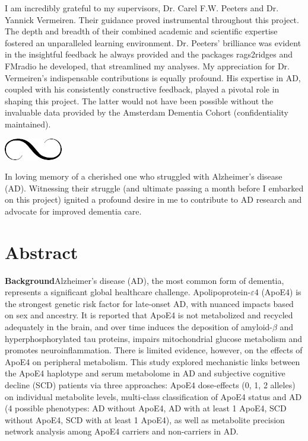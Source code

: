 \documentclass{amsart}
\newcommand{\parasep}{
\begin{center} 
   \includegraphics[scale=.3]{figures/eYzOK.png} 
\end{center}}
\begin{document}
I am incredibly grateful to my supervisors, Dr. Carel F.W. Peeters and Dr. Yannick Vermeiren. Their guidance proved instrumental throughout this project. The depth and breadth of their combined academic and scientific expertise fostered an unparalleled learning environment. Dr. Peeters' brilliance was evident in the insightful feedback he always provided and the packages \textsf{rags2ridges} and \textsf{FMradio} he developed, that streamlined my analyses. My appreciation for Dr. Vermeiren's indispensable contributions is equally profound. His expertise in AD, coupled with his consistently constructive feedback, played a pivotal role in shaping this project. The latter would not have been possible without the invaluable data provided by the Amsterdam Dementia Cohort (confidentiality maintained).\\
\parasep
In loving memory of a cherished one who struggled with Alzheimer's disease (AD). Witnessing their struggle (and ultimate passing a month before I embarked on this project) ignited a profound desire in me to contribute to AD research and advocate for improved dementia care.
\begin{figure}[!b]

\end{figure}
\newpage
{}
\section*{Abstract}
\textbf{Background}\hspace{.1cm}Alzheimer's disease (AD), the most common form of dementia, represents a significant global healthcare challenge. Apolipoprotein-$\varepsilon$4 (ApoE4) is the strongest genetic risk factor for late-onset AD, with nuanced impacts based on sex and ancestry. It is reported that ApoE4 is not metabolized and recycled adequately in the brain, and over time induces the deposition of amyloid-$\beta$ and hyperphosphorylated tau proteins, impairs mitochondrial glucose metabolism and promotes neuroinflammation. There is limited evidence, however, on the effects of ApoE4 on peripheral metabolism. This study explored mechanistic links between the ApoE4 haplotype and serum metabolome in AD and subjective cognitive decline (SCD) patients via three approaches: ApoE4 dose-effects (0, 1, 2 alleles) on individual metabolite levels, multi-class classification of ApoE4 status and AD (4 possible phenotypes: AD without ApoE4, AD with at least 1 ApoE4, SCD without ApoE4, SCD with at least 1 ApoE4), as well as metabolite precision network analysis among ApoE4 carriers and non-carriers in AD.
\end{document}
